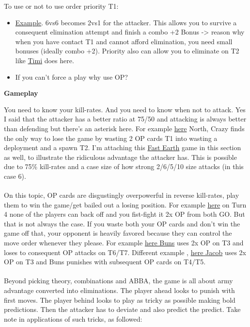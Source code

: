 To use or not to use order priority T1:
\begin{itemize}
    \item \href{https://www.warzone.com/MultiPlayer?GameID=41332988}{Example}. 6vs6 becomes 2vs1 for the attacker. This allows you to survive a consequent elimination attempt and finish a combo +2 Bonus -> reason why when you have contact T1 and cannot afford elimination, you need small bonuses (ideally combo +2). Priority also can allow you to eliminate on T2 like \href{https://www.warzone.com/MultiPlayer?GameID=38269700}{Timi} does here.
    \item If you can't force a play why use OP?
\end{itemize}

\textbf{Gameplay}

You need to know your kill-rates. And you need to know when not to attack. Yes I said that the attacker has a better ratio at 75/50 and attacking is always better than defending but there's an asterisk here. For example \href{https://www.warzone.com/MultiPlayer?GameID=41462025}{here} North, Crazy finds the only way to lose the game by wasting 2 OP cards T1 into wasting a deployment and a spawn T2. I'm attaching this \href{https://www.warzone.com/MultiPlayer?GameID=33724256}{Fast Earth} game in this section as well, to illustrate the ridiculous advantage the attacker has. This is possible due to 75\% kill-rates and a case size of how strong 2/6/5/10 size attacks (in this case 6).
\\
\\
On this topic, OP cards are disgustingly overpowerful in reverse kill-rates, play them to win the game/get bailed out a losing position. For example \href{https://www.warzone.com/MultiPlayer?GameID=18945767}{here} on Turn 4 none of the players can back off and you fist-fight it 2x OP from both GO. But that is not always the case. If you waste both your OP cards and don't win the game off that, your opponent is heavily favored because they can control the move order whenever they please. For example \href{https://www.warzone.com/MultiPlayer?GameID=41591749}{here Buns} uses 2x OP on T3 and loses to consequent OP attacks on T6/T7. Different example , 
\href{https://www.warzone.com/MultiPlayer?GameID=41769963}{here Jacob} uses 2x OP on T3 and Buns punishes with subsequent OP cards on T4/T5.
\\
\\
Beyond picking theory, combinations and ABBA, the game is all about army advantage converted into eliminations. The player ahead looks to punish with first moves. The player behind looks to play as tricky as possible making bold predictions. Then the attacker has to deviate and also predict the predict. Take note in applications of such tricks, as followed:
